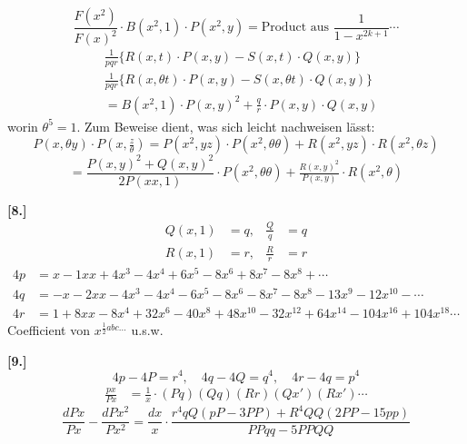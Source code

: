 \documentclass[10pt,a4paper]{article}
\begin{document}
\begin{equation*}
\frac{F(x^2)}{F(x)^2} \cdot B(x^2, 1) \cdot P(x^2, y) = \text{Product aus } \frac{1}{1 - x^{2k+1}} \cdots
\end{equation*}
%
\begin{align*}
&\tfrac{1}{pqr}\{R(x, t) \cdot P(x, y) - S(x, t) \cdot Q(x, y)\} \\
&\tfrac{1}{pqr}\{R(x, \theta t) \cdot P(x, y) - S(x, \theta t) \cdot Q(x, y)\} \\
&= B(x^2, 1) \cdot P(x, y)^2 + \tfrac{q}{r} \cdot P(x, y) \cdot Q(x, y)
\end{align*}
%
worin $\theta^5 = 1$. Zum Beweise dient, was sich leicht nachweisen l\"asst:
%
\begin{equation*}
P(x, \theta y) \cdot P(x, \tfrac{z}{\theta}) = P(x^2, yz) \cdot P(x^2, \theta\theta) + R(x^2, yz) \cdot R(x^2, \theta z)
\end{equation*}
%
\begin{equation*}
= \frac{P(x, y)^2 + Q(x, y)^2}{2P(xx, 1)} \cdot P(x^2, \theta\theta) + \tfrac{R(x, y)^2}{P(x, y)} \cdot R(x^2, \theta)
\end{equation*}

\textbf{[8.]}
%
\begin{align*}
Q(x, 1) &= q, & \frac{Q}{q} &= q \\
R(x, 1) &= r, & \frac{R}{r} &= r
\end{align*}
%
\begin{align*}
4p &= x - 1xx + 4x^3 - 4x^4 + 6x^5 - 8x^6 + 8x^7 - 8x^8 + \cdots \\
4q &= -x - 2xx - 4x^3 - 4x^4 - 6x^5 - 8x^6 - 8x^7 - 8x^8 - 13x^9 - 12x^{10} - \cdots \\
4r &= 1 + 8xx - 8x^4 + 32x^6 - 40x^8 + 48x^{10} - 32x^{12} + 64x^{14} - 104x^{16} + 104x^{18} \cdots
\end{align*}
%
Coefficient von $x^{\frac{1}{2}abc\ldots}$ u.s.w.

\textbf{[9.]}
%
\begin{equation*}
4p - 4P = r^4, \quad 4q - 4Q = q^4, \quad 4r - 4q = p^4
\end{equation*}
%
\begin{align*}
\frac{px}{Px} &= \frac{1}{x} \cdot (Pq)(Qq)(Rr)(Qx')(Rx') \cdots
\end{align*}
%
\begin{equation*}
\frac{dPx}{Px} - \frac{dPx^2}{Px^2} = \frac{dx}{x} \cdot \frac{r^4qQ(pP - 3PP) + R^4QQ(2PP - 15pp)}{PPqq - 5PPQQ}
\end{equation*}
\end{document}
